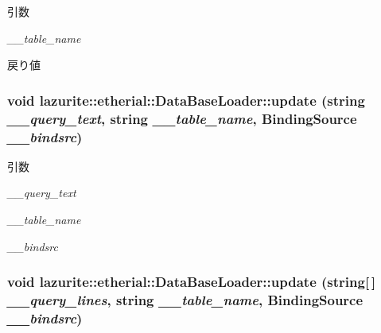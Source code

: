 \begin{DoxyParams}{引数}
\item[{\em \_\-\_\-table\_\-name}]\end{DoxyParams}
\begin{DoxyReturn}{戻り値}

\end{DoxyReturn}
\hypertarget{classlazurite_1_1etherial_1_1_data_base_loader_adb2ac9982ec750d6535e5b4a29ed40a6}{
\subsubsection[{update}]{\setlength{\rightskip}{0pt plus 5cm}void lazurite::etherial::DataBaseLoader::update (string {\em \_\-\_\-query\_\-text}, \/  string {\em \_\-\_\-table\_\-name}, \/  BindingSource {\em \_\-\_\-bindsrc})}}
\label{classlazurite_1_1etherial_1_1_data_base_loader_adb2ac9982ec750d6535e5b4a29ed40a6}

\begin{DoxyParams}{引数}
\item[{\em \_\-\_\-query\_\-text}]\item[{\em \_\-\_\-table\_\-name}]\item[{\em \_\-\_\-bindsrc}]\end{DoxyParams}
\hypertarget{classlazurite_1_1etherial_1_1_data_base_loader_a921d0ae9b16f7a3f79cc1a449548c12f}{
\subsubsection[{update}]{\setlength{\rightskip}{0pt plus 5cm}void lazurite::etherial::DataBaseLoader::update (string\mbox{[}$\,$\mbox{]} {\em \_\-\_\-query\_\-lines}, \/  string {\em \_\-\_\-table\_\-name}, \/  BindingSource {\em \_\-\_\-bindsrc})}}
\label{classlazurite_1_1etherial_1_1_data_base_loader_a921d0ae9b16f7a3f79cc1a449548c12f}

